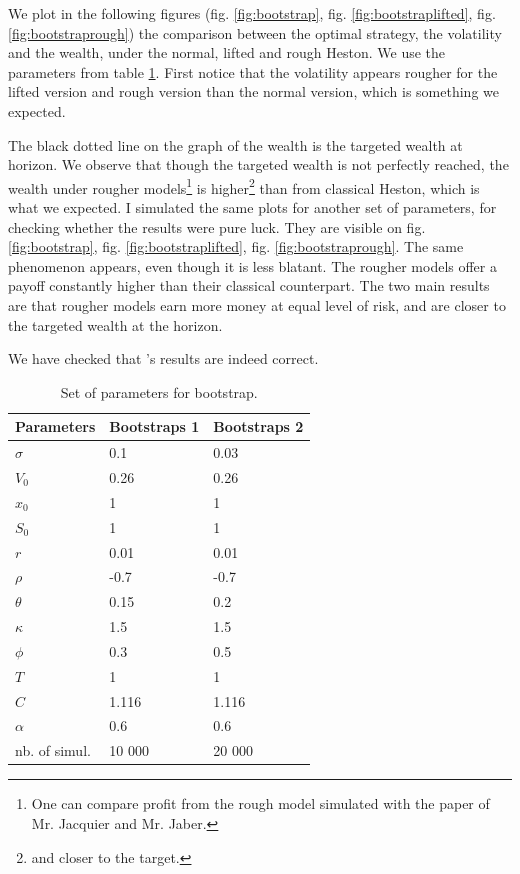 We plot in the following figures (fig. \ref{fig:bootstrap}, fig. \ref{fig:bootstraplifted}, fig. \ref{fig:bootstraprough}) the comparison between the optimal strategy, the volatility and the wealth, under the normal, lifted and rough Heston. We use the parameters from table \ref{tab:bootstrap}. First notice that the volatility appears rougher for the lifted version and rough version than the normal version, which is something we expected.

The black dotted line on the graph of the wealth is the targeted  wealth at horizon. We observe that though the targeted wealth is not perfectly reached, the wealth under rougher models\footnote{One can compare profit from the rough model simulated with the paper of Mr. Jacquier and Mr. Jaber.} is higher\footnote{and closer to the target.} than from classical Heston, which is what we expected. I simulated the same plots for another set of parameters, for checking whether the results were pure luck. They are visible on fig. \ref{fig:bootstrap}, fig. \ref{fig:bootstraplifted}, fig. \ref{fig:bootstraprough}. The same phenomenon appears, even though it is less blatant. The rougher models offer a payoff constantly higher than their classical counterpart.  The two main results are that rougher models earn more money at equal level of risk, and are closer to the targeted wealth at the horizon.

We have checked that \cite{HanWong}'s results are indeed correct.

\begin{table}
\begin{center}
\begin{tabular}{   m{4.5 cm} | m{4.5 cm}  | m{4.5 cm}  } 
\hline
 Parameters & Bootstraps 1 & Bootstraps 2 \\ 
\hline
\hline
$\sigma$ & 0.1 &  0.03 \\
\hline
$V_0$ &  0.26 &  0.26\\
\hline
$x_0$ &  1 & 1 \\
\hline
$S_0$ &  1 & 1 \\
\hline
$r$ & 0.01 & 0.01 \\
\hline
$\rho$ & -0.7 & -0.7 \\
\hline
$\theta$  & 0.15  &  0.2\\
\hline
$\kappa$ & 1.5 & 1.5  \\
\hline
$\phi$ & 0.3  & 0.5 \\
\hline
$T$ & 1 & 1 \\
\hline
$C$ & 1.116  &  1.116 \\
\hline
$\alpha$ & 0.6 & 0.6 \\
\hline
nb. of simul. & 10 000 & 20 000 \\
\hline
\end{tabular}
\caption{Set of parameters for bootstrap.}
\label{tab:bootstrap}
\end{center}
\end{table}



